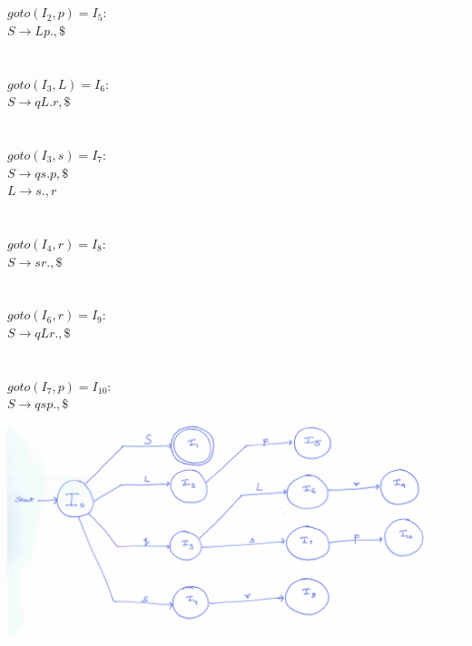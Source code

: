 \documentclass[10pt]{letter}
\begin{document}
\begin{enumerate}
\\
\\
$goto(I_{2},p)=I_{5}:$\\
$S \rightarrow Lp., \$$\\
\\
\\
$goto(I_{3},L)=I_{6}:$\\
$S \rightarrow qL.r, \$$\\
\\
\\
$goto(I_{3},s)=I_{7}:$\\
$S \rightarrow qs.p, \$$\\
$L \rightarrow s., r$\\
\\
\\
$goto(I_{4},r)=I_{8}:$\\
$S \rightarrow sr., \$$\\
\\
\\
$goto(I_{6},r)=I_{9}:$\\
$S \rightarrow qLr., \$$\\
\\
\\
$goto(I_{7},p)=I_{10}:$\\
$S \rightarrow qsp., \$$\\

\includegraphics[scale=0.5]{dfa_2}


\end{enumerate}
\end{document}
